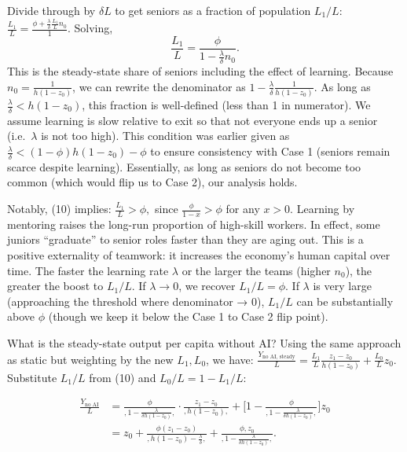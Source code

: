 \documentclass[12pt]{article}
\begin{document}
Divide through by \(\delta L\) to get seniors as a fraction of
population \(L_1/L\):
\(\frac{L_1}{L} = \frac{\phi + \frac{\lambda}{\delta} \frac{L_1}{L} n_0}{1}.\)
Solving, 
\begin{equation}
\frac{L_1}{L} =
\frac{\phi}{1 - \frac{\lambda}{\delta} n_0}. \tag{10}
\end{equation}
This is the steady-state share of seniors including the effect of
learning. Because \(n_0 = \frac{1}{h(1-z_0)}\), we can rewrite the
denominator as \(1 - \frac{\lambda}{\delta}\frac{1}{h(1-z_0)}\). As long
as \(\frac{\lambda}{\delta} < h(1-z_0)\), this fraction is well-defined
(less than 1 in numerator). We assume {learning is slow relative
to exit} so that not everyone ends up a senior (i.e.~\(\lambda\) is not
too high). This condition was earlier given as
\(\frac{\lambda}{\delta} < (1-\phi)h(1-z_0) - \phi\) to ensure
consistency with Case 1 (seniors remain scarce despite learning).
Essentially, as long as seniors do not become too common (which would
flip us to Case 2), our analysis holds.

Notably, (10) implies: \(\frac{L_1}{L} > \phi,\) since
\(\frac{\phi}{1 - x} > \phi\) for any \(x>0\). {Learning by
mentoring raises the long-run proportion of high-skill workers.} In
effect, some juniors ``graduate'' to senior roles faster than they are
aging out. This is a positive externality of teamwork: it increases the
economy's human capital over time. The faster the learning rate
\(\lambda\) or the larger the teams (higher \(n_0\)), the greater the
boost to \(L_1/L\). If \(\lambda \to 0\), we recover \(L_1/L = \phi\).
If \(\lambda\) is very large (approaching the threshold where
denominator → 0), \(L_1/L\) can be substantially above \(\phi\) (though
we keep it below the Case 1 to Case 2 flip point).

What is the {steady-state output per capita} without AI? Using
the same approach as static but weighting by the new \(L_1, L_0\), we
have:
\(\frac{Y_{\text{no AI, steady}}}{L} = \frac{L_1}{L} \frac{z_1 - z_0}{h(1-z_0)} + \frac{L_0}{L} z_0.\)
Substitute \(L_1/L\) from (10) and \(L_0/L = 1 - L_1/L\):

\begin{align*}
\frac{Y_{\text{no AI}}}{L} &= \frac{\phi}{,1 - \frac{\lambda}{\delta h(1-z_0)},} \cdot \frac{z_1 - z_0}{,h(1-z_0),} + \Big[1 - \frac{\phi}{,1 - \frac{\lambda}{\delta h(1-z_0)},}\Big] z_0 \\
&= z_0 + \frac{\phi (z_1 - z_0)}{,h(1-z_0) - \frac{\lambda}{\delta},} + \frac{\phi, z_0}{,1 - \frac{\lambda}{\delta h(1-z_0)},}.
\end{align*}
\end{document}
